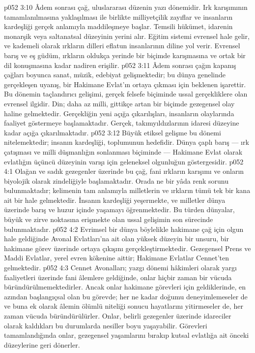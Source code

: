 \vs p052 3:10 Âdem sonrası çağ, uluslararası düzenin yazı dönemidir. Irk karışımının tamamlanılmasına yaklaşılması ile birlikte milliyetçilik zayıflar ve insanların kardeşliği gerçek anlamıyla maddileşmeye başlar. Temsili hükümet, idarenin monarşik veya saltanatsal düzeyinin yerini alır. Eğitim sistemi evrensel hale gelir, ve kademeli olarak ırkların dilleri eflatun insanlarının diline yol verir. Evrensel barış ve eş güdüm, ırkların oldukça yerinde bir biçimde karışmasına ve ortak bir dil konuşmasına kadar nadiren erişilir.
\vs p052 3:11 Âdem sonrası çağın kapanış çağları boyunca sanat, müzik, edebiyat gelişmektedir; bu dünya genelinde gerçekleşen uyanış, bir Hakimane Evlat’ın ortaya çıkması için beklenen işarettir. Bu dönemin taçlandırıcı gelişimi, gerçek felsefe biçiminde ussal gerçekliklere olan evrensel ilgidir. Din; daha az milli, gittikçe artan bir biçimde gezegensel olay haline gelmektedir. Gerçekliğin yeni açığa çıkarılışları, insanların olaylarında faaliyet göstermeye başlamaktadır. Gerçek, takımyıldızlarının idaresi düzeyine kadar açığa çıkarılmaktadır.
\vs p052 3:12 Büyük etiksel gelişme bu dönemi nitelemektedir; insanın kardeşliği, toplumunun hedefidir. Dünya çaplı barış --- ırk çatışması ve milli düşmanlığın sonlanması biçiminde --- Hakimane Evlat olarak evlatlığın üçüncü düzeyinin varışı için geleneksel olgunluğun göstergesidir.
\vs p052 4:1 Olağan ve sadık gezegenler üzerinde bu çağ, fani ırkların karışımı ve onların biyolojik olarak zindeliğiyle başlamaktadır. Orada ne bir yâda renk sorunu bulunmaktadır; kelimenin tam anlamıyla milletlerin ve ırkların tümü tek bir kana ait bir hale gelmektedir. İnsanın kardeşliği yeşermekte, ve milletler dünya üzerinde barış ve huzur içinde yaşamayı öğrenmektedir. Bu türden dünyalar, büyük ve zirve noktasına erişmekte olan ussal gelişimin son sürecinde bulunmaktadır.
\vs p052 4:2 Evrimsel bir dünya böylelikle hakimane çağ için olgun hale geldiğinde Avonal Evlatları’na ait olan yüksek düzeyin bir unsuru, bir hakimane görev üzerinde ortaya çıkışını gerçekleştirmektedir. Gezegensel Prens ve Maddi Evlatlar, yerel evren kökenine aittir; Hakimane Evlatlar Cennet’ten gelmektedir.
\vs p052 4:3 Cennet Avonalları; yazgı dönemi hâkimleri olarak yargı faaliyetleri üzerinde fani âlemlere geldiğinde, onlar hiçbir zaman bir vücuda büründürülmemektedirler. Ancak onlar hakimane görevleri için geldiklerinde, en azından başlangıçsal olan bu görevde; her ne kadar doğumu deneyimlemeseler de ve buna ek olarak âlemin ölümlü niteliği sonucu hayatlarını yitirmeseler de, her zaman vücuda büründürülürler. Onlar, belirli gezegenler üzerinde idareciler olarak kaldıkları bu durumlarda nesiller boyu yaşayabilir. Görevleri tamamlandığında onlar, gezegensel yaşamlarını bırakıp kutsal evlatlığa ait önceki düzeylerine geri dönerler.
